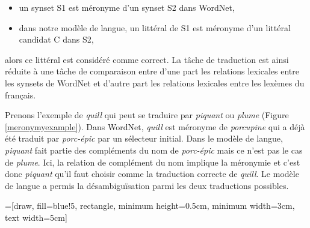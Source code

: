 \begin{itemize}

    \item un synset S1 est méronyme d'un synset S2 dans WordNet,

    \item dans notre modèle de langue, un littéral de S1 est méronyme d'un
        littéral candidat C dans S2,

\end{itemize}

alors ce littéral est considéré comme correct. La tâche de traduction est ainsi
réduite à une tâche de comparaison entre d'une part les relations lexicales
entre les synsets de WordNet et d'autre part les relations lexicales entre les
lexèmes du français.

Prenons l'exemple de \textit{quill} qui peut se traduire par \textit{piquant}
ou \textit{plume} (Figure \ref{meronymyexample}). Dans WordNet, \textit{quill}
est méronyme de \textit{porcupine} qui a déjà été traduit par
\textit{porc-épic} par un sélecteur initial. Dans le modèle de langue,
\textit{piquant} fait partie des compléments du nom de \textit{porc-épic} mais
ce n'est pas le cas de \textit{plume}. Ici, la relation de complément du nom
implique la méronymie et c'est donc \textit{piquant} qu'il faut choisir comme
la traduction correcte de \textit{quill}. Le modèle de langue a permis la
désambiguïsation parmi les deux traductions possibles.

=[draw, fill=blue!5, rectangle, minimum height=0.5cm, minimum width=3cm, text width=5cm]

